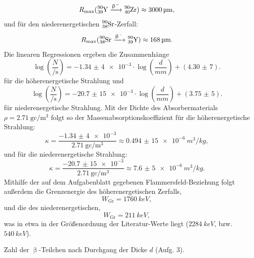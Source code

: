 \begin{equation}
R_\mathrm{max} (\ce{_{39}^{90} Y} \xrightarrow{\upbeta^-} \ce{_{40}^{90} Zr}) \approx \SI{3000}{\micro\meter},
\end{equation}
und für den niederenergetischen $\ce{_{38}^{90} Sr}$-Zerfall:
\begin{equation}
R_\mathrm{max} (\ce{_{38}^{90} Sr} \xrightarrow{\upbeta^-} \ce{_{39}^{90} Y}) \approx \SI{168}{\micro\meter}.
\end{equation}
Die linearen Regressionen ergeben die Zusammenhänge
\begin{equation}
\log\left(\frac{N}{\si{\per\second}}\right) = \num{-1,34(4)e-3} \cdot \log\left(\frac{d}{\si{mm}}\right) + (\num{4,30(7)}).
\end{equation}
für die höherenergetische Strahlung und
\begin{equation}
\log\left(\frac{N}{\si{\per\second}}\right) = \num{-20,7(15)e-3} \cdot \log\left(\frac{d}{\si{mm}}\right) + (\num{3,75(5)}).
\end{equation}
für niederenergetische Strahlung. Mit der Dichte des Absorbermaterials $\rho=\SI{2,71}{\gram\centi\per\meter^3}$ folgt so der Massenabsorptionskoeffizient für die höherenergetische Strahlung:
\begin{equation}
\kappa = \frac{\num{-1,34(4)e-3}}{\SI{2,71}{\gram\centi\per\meter^3}} \approx \SI{0,494(15)e-6}{m^3/kg},
\end{equation}
und für die niederenergetische Strahlung:
\begin{equation}
\kappa = \frac{\num{-20,7(15)e-3}}{\SI{2,71}{\gram\centi\per\meter^3}} \approx \SI{7,6(5)e-6}{m^3/kg}.
\end{equation}
Mithilfe der auf dem Aufgabenblatt gegebenen Flammersfeld-Beziehung folgt außerdem die Grenzenergie des höherenergetischen Zerfalls,
\begin{equation}
W_\mathrm{Gr} = \SI{1760}{keV},
\end{equation}
und die des niederenergetischen,
\begin{equation}
W_\mathrm{Gr} = \SI{211}{keV},
\end{equation}
was in etwa in der Größenordnung der Literatur-Werte liegt ($\SI{2284}{keV}$, bzw. $\SI{540}{keV}$).

\begin{table}[tb]
	\centering
	\caption{Zahl der $\upbeta$-Teilchen nach Durchgang der Dicke $d$ (Aufg. 3).}
	\label{tab:ii_3}
	
	\vspace{8mm}
\end{table}

